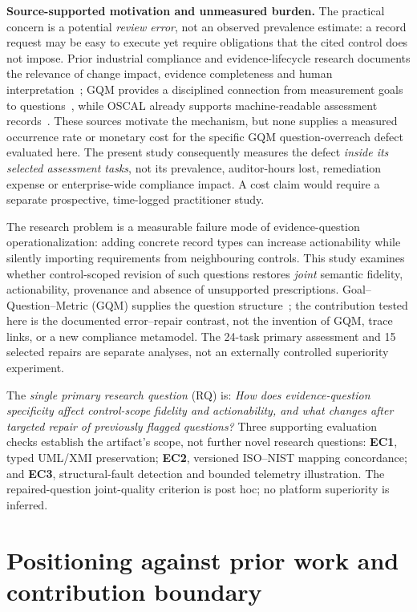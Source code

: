 \documentclass[12pt,a4paper]{article}
\begin{document}
\noindent\textbf{Source-supported motivation and unmeasured burden.}
The practical concern is a potential \emph{review error}, not an observed prevalence estimate: a record request may be easy to execute yet require obligations that the cited control does not impose. Prior industrial compliance and evidence-lifecycle research documents the relevance of change impact, evidence completeness and human interpretation~\cite{DelaVara2022SoSyM,Nair2015IST}; GQM provides a disciplined connection from measurement goals to questions~\cite{Basili2014GQM}, while OSCAL already supports machine-readable assessment records~\cite{NIST_OSCAL_2026}. These sources motivate the mechanism, but none supplies a measured occurrence rate or monetary cost for the specific GQM question-overreach defect evaluated here. The present study consequently measures the defect \emph{inside its selected assessment tasks}, not its prevalence, auditor-hours lost, remediation expense or enterprise-wide compliance impact. A cost claim would require a separate prospective, time-logged practitioner study.

The research problem is a measurable failure mode of evidence-question operationalization: adding concrete record types can increase actionability while silently importing requirements from neighbouring controls. This study examines whether control-scoped revision of such questions restores \emph{joint} semantic fidelity, actionability, provenance and absence of unsupported prescriptions. Goal--Question--Metric (GQM) supplies the question structure~\cite{Basili2014GQM}; the contribution tested here is the documented error--repair contrast, not the invention of GQM, trace links, or a new compliance metamodel. The 24-task primary assessment and 15 selected repairs are separate analyses, not an externally controlled superiority experiment.

The \emph{single primary research question} (RQ) is: \emph{How does evidence-question specificity affect control-scope fidelity and actionability, and what changes after targeted repair of previously flagged questions?} Three supporting evaluation checks establish the artifact's scope, not further novel research questions: \textbf{EC1}, typed UML/XMI preservation; \textbf{EC2}, versioned ISO--NIST mapping concordance; and \textbf{EC3}, structural-fault detection and bounded telemetry illustration. The repaired-question joint-quality criterion is post hoc; no platform superiority is inferred.

\section{Positioning against prior work and contribution boundary}
\label{sec:related_novelty}
\end{document}
